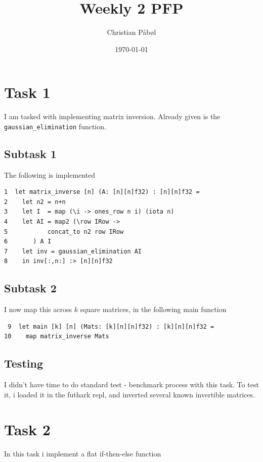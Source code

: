 \documentclass[11pt]{article}
\author{Christian Påbøl}
\date{\today}
\title{Weekly 2 PFP}
\begin{document}
\maketitle
\tableofcontents

\section{Task 1}
\label{sec:org02c8c88}
I am tasked with implementing matrix inversion. Already given is the \texttt{gaussian\_elimination} function.

\subsection{Subtask 1}
\label{sec:org739dc65}
The following is implemented
\begin{verbatim}
1  let matrix_inverse [n] (A: [n][n]f32) : [n][n]f32 =
2    let n2 = n+n
3    let I  = map (\i -> ones_row n i) (iota n)
4    let AI = map2 (\row IRow ->
5  		    concat_to n2 row IRow
6  		) A I
7    let inv = gaussian_elimination AI
8    in inv[:,n:] :> [n][n]f32
\end{verbatim}

\subsection{Subtask 2}
\label{sec:orgd320c82}
I now map this across \(k\) square matrices, in the following main function
\begin{verbatim}
 9  let main [k] [n] (Mats: [k][n][n]f32) : [k][n][n]f32 =
10    map matrix_inverse Mats
\end{verbatim}

\subsection{Testing}
\label{sec:orgaf43872}
I didn't have time to do standard test - benchmark process with this task. To test it, i loaded
it in the futhark repl, and inverted several known invertible matrices.

\section{Task 2}
\label{sec:org8eb16de}
In this task i implement a flat if-then-else function
\end{document}
